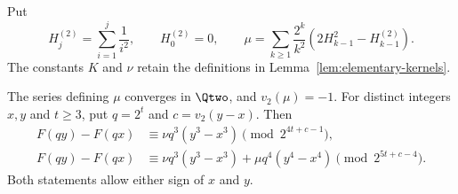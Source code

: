 Put
\[
 H_j^{(2)}=\sum_{i=1}^j\frac1{i^2},\qquad H_0^{(2)}=0,
 \qquad
 \mu=\sum_{k\ge1}\frac{2^k}{k^2}
       \left(2H_{k-1}^2-H_{k-1}^{(2)}\right).
\]
The constants $K$ and $\nu$ retain the definitions in
Lemma~\ref{lem:elementary-kernels}.

\begin{proposition}\label{prop:cubic-t3}
The series defining $\mu$ converges in $\Qtwo$, and $v_2(\mu)=-1$.
For distinct integers $x,y$ and $t\ge3$, put $q=2^t$ and
$c=v_2(y-x)$. Then
\begin{align}
 F(qy)-F(qx)
 &\equiv\nu q^3(y^3-x^3)
          \pmod{2^{4t+c-1}},\label{eq:sharpened-cubic}\\
 F(qy)-F(qx)
 &\equiv\nu q^3(y^3-x^3)+\mu q^4(y^4-x^4)
          \pmod{2^{5t+c-4}}.\label{eq:quartic-increment}
\end{align}
Both statements allow either sign of $x$ and $y$.
\end{proposition}
